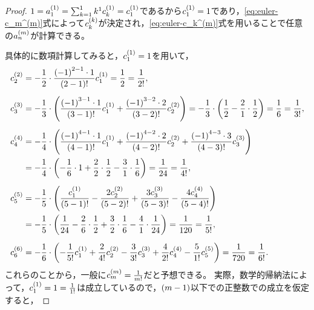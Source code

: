 \documentclass[a4paper,draft]{ltjsarticle}
\begin{document}
\begin{thm}
\begin{proof}
        $1=a_1^{\pare{1}}=\sum_{k=1}^1 k^1 c_k^{\pare{1}}=c_1^{\pare{1}}$であるから$c_1^{\pare{1}}=1$であり，\eqref{eq:euler-c_m^(m)}式によって$c_k^{\pare{k}}$が決定され，\eqref{eq:euler-c_k^(m)}式を用いることで任意の$a_n^{\pare{m}}$が計算できる。
        
        具体的に数項計算してみると，$c_1^{\pare{1}}=1$を用いて，
        \begin{align}
            c_2^{\pare{2}}&=-\frac{1}{2}\cdot \frac{\pare{-1}^{2-1}\cdot 1}{\pare{2-1}!}c_1^{\pare{1}}=\frac{1}{2}=\frac{1}{2!},
            \\[5pt]
            c_3^{\pare{3}}&=-\frac{1}{3}\cdot \pare{
                \frac{\pare{-1}^{3-1}\cdot 1}{\pare{3-1}!}c_1^{\pare{1}}
                +\frac{\pare{-1}^{3-2}\cdot 2}{\pare{3-2}!}c_2^{\pare{2}}
            }=-\frac{1}{3}\cdot \pare{\frac{1}{2}-\frac{2}{1}\cdot \frac{1}{2}}=\frac{1}{6}=\frac{1}{3!},
            \\[5pt]
            c_4^{\pare{4}}&=-\frac{1}{4}\cdot \pare{
                \frac{\pare{-1}^{4-1}\cdot 1}{\pare{4-1}!}c_1^{\pare{1}}
                +\frac{\pare{-1}^{4-2}\cdot 2}{\pare{4-2}!}c_2^{\pare{2}}
                +\frac{\pare{-1}^{4-3}\cdot 3}{\pare{4-3}!}c_3^{\pare{3}}
            }
            \\
            &=-\frac{1}{4}\cdot \pare{-\frac{1}{6}\cdot 1+\frac{2}{2}\cdot \frac{1}{2}-\frac{3}{1}\cdot \frac{1}{6}}=\frac{1}{24}=\frac{1}{4!},
            \\[5pt]
            c_5^{\pare{5}}&=-\frac{1}{5}\cdot \pare{
                \frac{c_1^{\pare{1}}}{\pare{5-1}!}
                -\frac{2c_2^{\pare{2}}}{\pare{5-2}!}
                +\frac{3c_3^{\pare{3}}}{\pare{5-3}!}
                -\frac{4c_4^{\pare{4}}}{\pare{5-4}!}
                }
            \\
            &=-\frac{1}{5}\cdot \pare{\frac{1}{24}-\frac{2}{6}\cdot \frac{1}{2}+\frac{3}{2}\cdot \frac{1}{6}-\frac{4}{1}\cdot \frac{1}{24}}=\frac{1}{120}=\frac{1}{5!},
            \\[5pt]
            c_6^{\pare{6}}&=-\frac{1}{6}\cdot \pare{
                -\frac{1}{5!}c_1^{\pare{1}}
                +\frac{2}{4!}c_2^{\pare{2}}
                -\frac{3}{3!}c_3^{\pare{3}}
                +\frac{4}{2!}c_4^{\pare{4}}
                -\frac{5}{1!}c_5^{\pare{5}}
            }
            =\frac{1}{720}=\frac{1}{6!}.
        \end{align}
        これらのことから，一般に$c_m^{\pare{m}}=\frac{1}{m!}$だと予想できる。
        実際，数学的帰納法によって，$c_1^{\pare{1}}=1=\frac{1}{1!}$は成立しているので，$\pare{m-1}$以下での正整数での成立を仮定すると，

\end{proof}
\end{thm}
\end{document}
